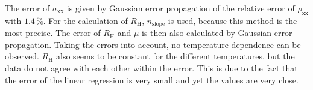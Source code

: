 The error of $\sigma_\text{xx}$ is given by Gaussian error propagation of the relative error of $\rho_\text{xx}$ with $1.4\,\%$.
For the calculation of $R_\text{H}$, $n_\text{slope}$ is used, because this method is the most precise.
The error of $R_\text{H}$ and $\mu$ is then also calculated by Gaussian error propagation.
Taking the errors into account, no temperature dependence can be observed. 
$R_\text{H}$ also seems to be constant for the different temperatures, 
but the data do not agree with each other within the error. 
This is due to the fact that the error of the linear regression is very small and yet the values are very close.
